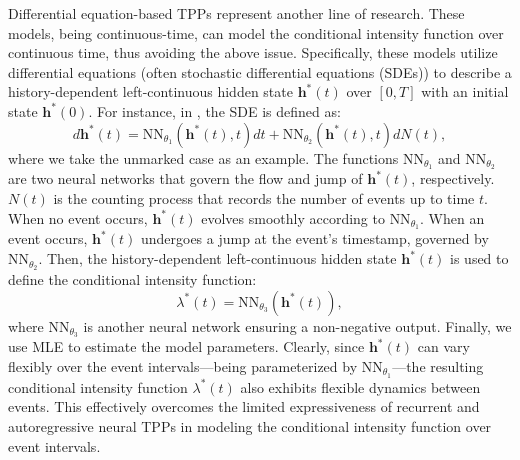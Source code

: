 \documentclass[10pt]{article} %
\begin{document}
Differential equation-based TPPs represent another line of research. These models, being continuous-time, can model the conditional intensity function over continuous time, thus avoiding the above issue.  
Specifically, these models utilize differential equations (often stochastic differential equations (SDEs)) to describe a history-dependent left-continuous hidden state \(\mathbf{h}^*(t)\) over \([0, T]\) with an initial state \(\mathbf{h}^*(0)\). For instance, in \citet{jia2019neural}, the SDE is defined as: 
\begin{equation}
    d\mathbf{h}^*(t)=\text{NN}_{\theta_1}(\mathbf{h}^*(t),t)dt+\text{NN}_{\theta_2}(\mathbf{h}^*(t),t)dN(t), 
    \label{sde}
\end{equation}
where we take the unmarked case as an example. The functions \(\text{NN}_{\theta_1}\) and \(\text{NN}_{\theta_2}\) are two neural networks that govern the flow and jump of \(\mathbf{h}^*(t)\), respectively. \(N(t)\) is the counting process that records the number of events up to time \(t\). When no event occurs, \(\mathbf{h}^*(t)\) evolves smoothly according to \(\text{NN}_{\theta_1}\). When an event occurs, \(\mathbf{h}^*(t)\) undergoes a jump at the event's timestamp, governed by \(\text{NN}_{\theta_2}\). 
Then, the history-dependent left-continuous hidden state \(\mathbf{h}^*(t)\) is used to define the conditional intensity function: 
\begin{equation}
\lambda^*(t) = \text{NN}_{\theta_3}(\mathbf{h}^*(t)), 
\label{sde_intensity}
\end{equation}
where \(\text{NN}_{\theta_3}\) is another neural network ensuring a non-negative output. Finally, we use MLE to estimate the model parameters. 
Clearly, since \(\mathbf{h}^*(t)\) can vary flexibly over the event intervals—being parameterized by \(\text{NN}_{\theta_1}\)—the resulting conditional intensity function \(\lambda^*(t)\) also exhibits flexible dynamics between events. This effectively overcomes the limited expressiveness of recurrent and autoregressive neural TPPs in modeling the conditional intensity function over event intervals. 
\end{document}
